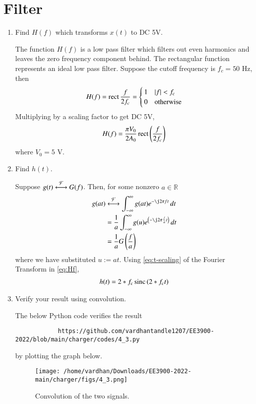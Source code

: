 \documentclass[journal,12pt,twocolumn]{IEEEtran}
\renewcommand\thesection{\arabic{section}}
\begin{document}
	\section{Filter}
	\begin{enumerate}[label=\thesection.\arabic*
		,ref=\thesection.\theenumi]
		\item Find $H(f)$ which transforms $x(t)$ to DC 5V.
		
		\solution The function $H(f)$ is a low pass filter which filters out
		even harmonics and leaves the zero frequency component behind.
		The rectangular function represents an ideal low pass filter. 
		Suppose the cutoff frequency is $f_c = 50$ Hz, then
		\begin{align}
			H(f) = \mathop{\mathrm{rect}}{\frac{f}{2f_c}} =
			\begin{cases}
				1 & \left\vert f\right\vert < f_c \\
				0 & \textrm{otherwise}
			\end{cases}
			\label{eq:Hf}
		\end{align}
		Multiplying by a scaling factor to get DC 5V,
		\begin{align}
			H(f) = \frac{\pi V_0}{2A_0}\mathop{\mathrm{rect}}{\left(\frac{f}{2f_c}\right)}
		\end{align}
		where $V_0 = 5$ V.
		\item Find $h(t)$.
		
		\solution Suppose $g(t)\overset{\mathcal{F}}{ \longleftrightarrow}G(f)$. Then, for some
		nonzero $a \in \mathbb{R}$
		\begin{align}
			g(at)&\system{F}\int_{-\infty}^{\infty}g(at)e^{-\j2\pi ft}\, dt \\
			&=\frac{1}{a}\int_{-\infty}^{\infty}g(u)e^{\brak{-\j2\pi \frac{f}{a}t}}\, dt \\
			&=\frac{1}{a}G\brak{\frac{f}{a}}
			\label{eq:t-scaling}
		\end{align}
		where we have substituted $u := at$. Using 
		\eqref{eq:t-scaling} of the Fourier Transform in \eqref{eq:Hf},
		\begin{align}
			h(t) = 2*f_c\mathop{\mathrm{sinc}}\left(2*f_ct\right)
		\end{align}
		\item Verify your result using convolution.
		
		\solution The below Python code verifies the result
		\begin{lstlisting}
			https://github.com/vardhantandle1207/EE3900-2022/blob/main/charger/codes/4_3.py
		\end{lstlisting}
		by plotting the graph below.
		\begin{figure}[!ht]
			\texttt{[image: /home/vardhan/Downloads/EE3900-2022-main/charger/figs/4\_3.png]}
			\caption{Convolution of the two signals.}
			\label{eq:fig-conv}
		\end{figure}
	\end{enumerate}
\end{document}
